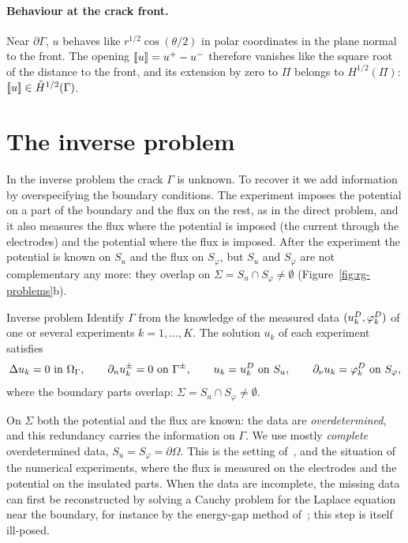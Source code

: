 \paragraph{Behaviour at the crack front.} Near $\partial\Gamma$, $u$ behaves like $r^{1/2}\cos(\theta/2)$ in polar coordinates in the plane normal to the front. The opening $[\![u]\!]=u^+-u^-$ therefore vanishes like the square root of the distance to the front, and its extension by zero to $\Pi$ belongs to $H^{1/2}(\Pi)$: $[\![u]\!]\in\tilde H^{1/2}(\Gamma)$.
%

\section{The inverse problem}\label{sec:rg-inverse}
%
In the inverse problem the crack $\Gamma$ is unknown. To recover it we add information by overspecifying the boundary conditions. The experiment imposes the potential on a part of the boundary and the flux on the rest, as in the direct problem, and it also measures the flux where the potential is imposed (the current through the electrodes) and the potential where the flux is imposed. After the experiment the potential is known on $S_u$ and the flux on $S_\varphi$, but $S_u$ and $S_\varphi$ are not complementary any more: they overlap on $\Sigma=S_u\cap S_\varphi\neq\emptyset$ (Figure~\ref{fig:rg-problems}b).

\begin{gbox}{Inverse problem}
Identify $\Gamma$ from the knowledge of the measured data $(u^{D}_k,\varphi^{D}_k)$ of one or several experiments $k=1,\dots,K$. The solution $u_k$ of each experiment satisfies
\[
\Delta u_k=0\ \text{in }\OG,\qquad \partial_nu_k^\pm=0\ \text{on }\Gamma^\pm,\qquad
u_k=\uD_k\ \text{on }S_u,\qquad \partial_\nu u_k=\pD_k\ \text{on }S_\varphi,
\]
where the boundary parts overlap: $\Sigma=S_u\cap S_\varphi\neq\emptyset$.
\end{gbox}

On $\Sigma$ both the potential and the flux are known: the data are \emph{overdetermined}, and this redundancy carries the information on $\Gamma$. We use mostly \emph{complete} overdetermined data, $S_u=S_\varphi=\partial\Omega$. This is the setting of~\cite{AB96}, and the situation of the numerical experiments, where the flux is measured on the electrodes and the potential on the insulated parts. When the data are incomplete, the missing data can first be reconstructed by solving a Cauchy problem for the Laplace equation near the boundary, for instance by the energy-gap method of~\cite{ABB06}; this step is itself ill-posed.

